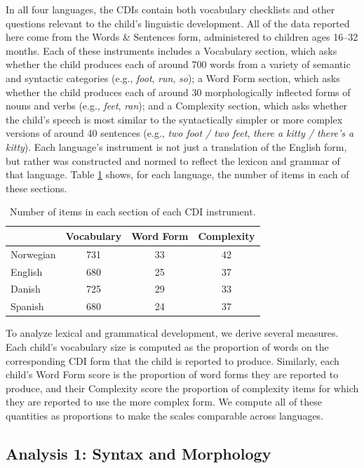 \documentclass[10pt,letterpaper]{article}
\begin{document}
In all four languages, the CDIs contain both vocabulary checklists and other questions relevant to the child's linguistic development. All of the data reported here come from the Words \& Sentences form, administered to children ages 16--32 months. Each of these instruments includes a Vocabulary section, which asks whether the child produces each of around 700 words from a variety of semantic and syntactic categories (e.g., \emph{foot}, \emph{run}, \emph{so}); a Word Form section, which asks whether the child produces each of around 30 morphologically inflected forms of nouns and verbs (e.g., \emph{feet}, \emph{ran}); and a Complexity section, which asks whether the child's speech is most similar to the syntactically simpler or more complex versions of around 40 sentences (e.g., \emph{two foot / two feet}, \emph{there a kitty / there's a kitty}). Each language's instrument is not just a translation of the English form, but rather was constructed and normed to reflect the lexicon and grammar of that language. Table \ref{table:measures} shows, for each language, the number of items in each of these sections.

\begin{table}
\begin{center}
\begin{tabular}{lccc}
\hline
& Vocabulary & Word Form & Complexity\\ 
\hline
Norwegian & 731 & 33 & 42\\ 
English & 680 & 25 & 37\\ 
Danish & 725 & 29 & 33\\ 
Spanish & 680 & 24 & 37\\ 
\hline
\end{tabular}
\end{center}
\caption{\label{table:measures} Number of items in each section of each CDI instrument.}
\end{table}

To analyze lexical and grammatical development, we derive several measures. Each child's vocabulary size is computed as the proportion of words on the corresponding CDI form that the child is reported to produce. Similarly, each child's Word Form score is the proportion of word forms they are reported to produce, and their Complexity score the proportion of complexity items for which they are reported to use the more complex form. We compute all of these quantities as proportions to make the scales comparable across languages.

\subsection{Analysis 1: Syntax and Morphology}
\end{document}
